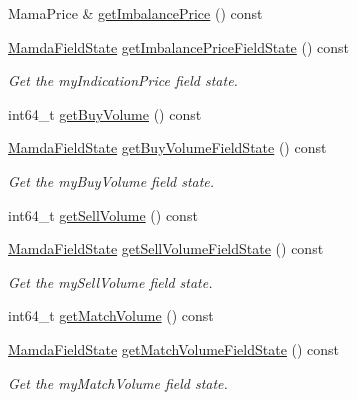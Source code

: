 \begin{CompactItemize}
Mama\-Price \& \hyperlink{classWombat_1_1MamdaOrderImbalanceListener_ecc32af60d82a040a0ca3e7c79075fc5}{get\-Imbalance\-Price} () const 
\item 
\hyperlink{namespaceWombat_93aac974f2ab713554fd12a1fa3b7d2a}{Mamda\-Field\-State} \hyperlink{classWombat_1_1MamdaOrderImbalanceListener_44f4f51fd6248a092825200e42c008a5}{get\-Imbalance\-Price\-Field\-State} () const 
\begin{CompactList}\small\item\em Get the my\-Indication\-Price field state. \item\end{CompactList}\item 
int64\_\-t \hyperlink{classWombat_1_1MamdaOrderImbalanceListener_7f5cb04154fe3ec2673e616a5958b9f2}{get\-Buy\-Volume} () const 
\item 
\hyperlink{namespaceWombat_93aac974f2ab713554fd12a1fa3b7d2a}{Mamda\-Field\-State} \hyperlink{classWombat_1_1MamdaOrderImbalanceListener_979197d028cd40ebe9d689c52377f02c}{get\-Buy\-Volume\-Field\-State} () const 
\begin{CompactList}\small\item\em Get the my\-Buy\-Volume field state. \item\end{CompactList}\item 
int64\_\-t \hyperlink{classWombat_1_1MamdaOrderImbalanceListener_fce0392a0c33cf57e534908cb29cd10e}{get\-Sell\-Volume} () const 
\item 
\hyperlink{namespaceWombat_93aac974f2ab713554fd12a1fa3b7d2a}{Mamda\-Field\-State} \hyperlink{classWombat_1_1MamdaOrderImbalanceListener_83655805e56c6a77ef48d0b6a5129f7b}{get\-Sell\-Volume\-Field\-State} () const 
\begin{CompactList}\small\item\em Get the my\-Sell\-Volume field state. \item\end{CompactList}\item 
int64\_\-t \hyperlink{classWombat_1_1MamdaOrderImbalanceListener_db5df0bb4c22c84ef0572046aaf98220}{get\-Match\-Volume} () const 
\item 
\hyperlink{namespaceWombat_93aac974f2ab713554fd12a1fa3b7d2a}{Mamda\-Field\-State} \hyperlink{classWombat_1_1MamdaOrderImbalanceListener_bbba7d810e3b01e9b2041d3a0e0e517d}{get\-Match\-Volume\-Field\-State} () const 
\begin{CompactList}\small\item\em Get the my\-Match\-Volume field state. \item\end{CompactList}\item 

\end{CompactItemize}
